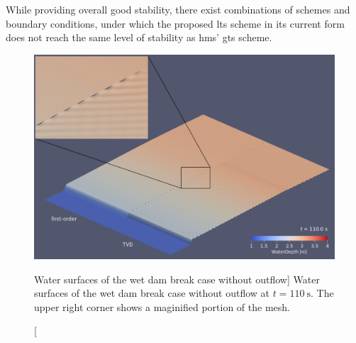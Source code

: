 While providing overall good stability, there exist combinations of schemes and boundary conditions, under which the proposed \gls{lts} scheme in its current form does not reach the same level of stability as \gls{hms}' \gls{gts} scheme.

\begin{figure}[H]
  \centering
  \includegraphics[width=\textwidth]{./img/cons_dambreak-t110.png}
  \caption
  [Water surfaces of the wet dam break case without outflow]
  {Water surfaces of the wet dam break case without outflow at $t=\SI{110}{\second}$. The upper right corner shows a maginified portion of the mesh. }\label{fig:tvd-checker-boarding}
  \vspace{-1cm}
\end{figure}